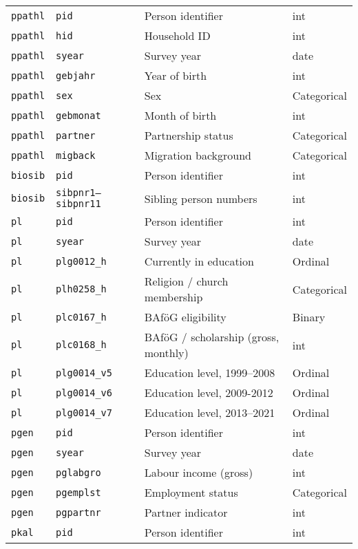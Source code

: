 \begin{longtable}{llll}
\bottomrule
\endlastfoot
\texttt{ppathl} & \texttt{pid} & Person identifier & int \\
\texttt{ppathl} & \texttt{hid} & Household ID & int \\
\texttt{ppathl} & \texttt{syear} & Survey year & date \\
\texttt{ppathl} & \texttt{gebjahr} & Year of birth & int \\
\texttt{ppathl} & \texttt{sex} & Sex & Categorical \\
\texttt{ppathl} & \texttt{gebmonat} & Month of birth & int \\
\texttt{ppathl} & \texttt{partner} & Partnership status & Categorical \\
\texttt{ppathl} & \texttt{migback} & Migration background & Categorical \\
\texttt{biosib} & \texttt{pid} & Person identifier & int \\
\texttt{biosib} & \texttt{sibpnr1--sibpnr11} & Sibling person numbers & int \\
\texttt{pl} & \texttt{pid} & Person identifier & int \\
\texttt{pl} & \texttt{syear} & Survey year & date \\
\texttt{pl} & \texttt{plg0012\_h} & Currently in education & Ordinal \\
\texttt{pl} & \texttt{plh0258\_h} & Religion / church membership & Categorical \\
\texttt{pl} & \texttt{plc0167\_h} & BAföG eligibility & Binary \\
\texttt{pl} & \texttt{plc0168\_h} & BAföG / scholarship (gross, monthly) & int \\
\texttt{pl} & \texttt{plg0014\_v5} & Education level, 1999--2008 & Ordinal \\
\texttt{pl} & \texttt{plg0014\_v6} & Education level, 2009-2012 & Ordinal \\
\texttt{pl} & \texttt{plg0014\_v7} & Education level, 2013--2021 & Ordinal \\
\texttt{pgen} & \texttt{pid} & Person identifier & int \\
\texttt{pgen} & \texttt{syear} & Survey year & date \\
\texttt{pgen} & \texttt{pglabgro} & Labour income (gross) & int \\
\texttt{pgen} & \texttt{pgemplst} & Employment status & Categorical \\
\texttt{pgen} & \texttt{pgpartnr} & Partner indicator & int \\
\texttt{pkal} & \texttt{pid} & Person identifier & int \\

\end{longtable}
